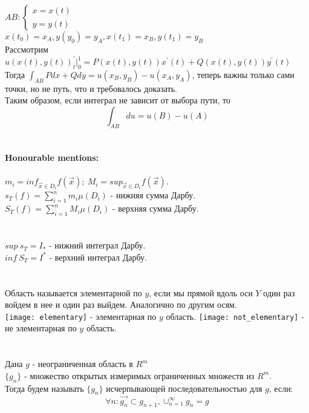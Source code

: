 \documentclass[12pt]{article}
\begin{document}
$AB: \begin{cases}x=x(t)\\ y=y(t) \end{cases}$\\
$x(t_0) = x_A, y(y_0) = y_A, x(t_1) = x_B, y(t_1) = y_B$\\
Рассмотрим $u(x(t),y(t))^{'}_t|_0^1=P(x(t),y(t))x^{'}(t)+Q(x(t),y(t))y^{'}(t)$\\
Тогда $\int_{AB} Pdx + Qdy = u(x_B, y_B) - u(x_A, y_A)$, теперь важны только сами точки, но не путь, что и требовалось доказать.\\
Таким образом, если интеграл не зависит от выбора пути, то\\
$$\int_{AB} du = u(B) - u(A)$$
\\
\\
\textbf{Honourable mentions:}\\ 
\label{darbouxSum}\\
$m_i = inf_{\overrightarrow{x} \in D_i} f(\overrightarrow{x}); \  M_i = sup_{\overrightarrow{x} \in D_i} f(\overrightarrow{x})$.\\
$s_T(f) = \sum_{i=1}^n m_i \mu(D_i)$ - нижняя сумма Дарбу.\\
$S_T(f) = \sum_{i=1}^n M_i \mu(D_i)$ - верхняя сумма Дарбу.\\
\\
\label{darbouxInt}\\
$sup \ s_T = I_{*}$ - нижний интеграл Дарбу.\\
$inf \ S_T = I^{*}$ - верхний интеграл Дарбу.\\
\\
\label{elementaryDomain}\\
Область называется элементарной по $y$, если мы прямой вдоль оси $Y$ один раз войдем в нее и один раз выйдем. Аналогично по другим осям.\\
\texttt{[image: elementary]} - элементарная по $y$ область. \texttt{[image: not\_elementary]} - не элементарная по $y$ область.\\
\\
\label{exhaustSeq}\\
Дана $g$ - неограниченная область в $R^m$\\
$\{ g_n \}$ - множество открытых измеримых ограниченных множеств из $R^m$.\\
Тогда будем называть $\{ g_n \}$ исчерпывающей последовательностью для $g$, если:\\
$$\forall n : \overrightarrow{g_n} \subset g_{n+1}, \cup_{n=1}^{\infty} g_n = g$$
\end{document}
